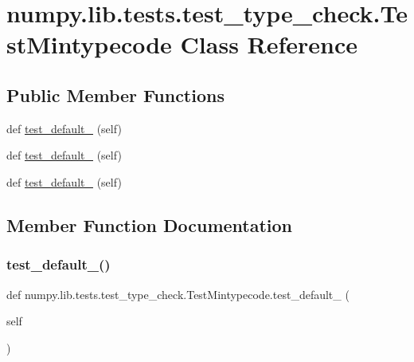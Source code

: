 \hypertarget{classnumpy_1_1lib_1_1tests_1_1test__type__check_1_1TestMintypecode}{}\section{numpy.\+lib.\+tests.\+test\+\_\+type\+\_\+check.\+Test\+Mintypecode Class Reference}
\label{classnumpy_1_1lib_1_1tests_1_1test__type__check_1_1TestMintypecode}
\subsection*{Public Member Functions}
\begin{DoxyCompactItemize}
\item 
def \hyperlink{classnumpy_1_1lib_1_1tests_1_1test__type__check_1_1TestMintypecode_ac89353a211fab7ef74490b7d1d046b94}{test\+\_\+default\+\_} (self)
\item 
def \hyperlink{classnumpy_1_1lib_1_1tests_1_1test__type__check_1_1TestMintypecode_a2c546ef6ce9d118841e27b73eeed1e67}{test\+\_\+default\+\_} (self)
\item 
def \hyperlink{classnumpy_1_1lib_1_1tests_1_1test__type__check_1_1TestMintypecode_aeda314bad2bc1e29999630fcd7a6e17a}{test\+\_\+default\+\_} (self)
\end{DoxyCompactItemize}


\subsection{Member Function Documentation}
\mbox{\label{classnumpy_1_1lib_1_1tests_1_1test__type__check_1_1TestMintypecode_ac89353a211fab7ef74490b7d1d046b94}} 
\subsubsection{\texorpdfstring{test\+\_\+default\+\_()}{test\_default\_1()}}
{\footnotesize\ttfamily def numpy.\+lib.\+tests.\+test\+\_\+type\+\_\+check.\+Test\+Mintypecode.\+test\+\_\+default\+\_ (\begin{DoxyParamCaption}\item[{}]{self }\end{DoxyParamCaption})}

